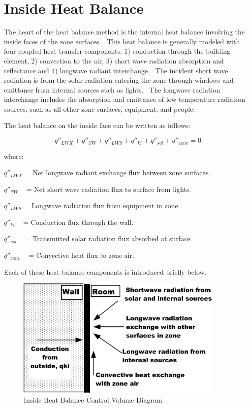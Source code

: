 \section{Inside Heat Balance}\label{inside-heat-balance}

The heart of the heat balance method is the internal heat balance involving the inside faces of the zone surfaces.~ This heat balance is generally modeled with four coupled heat transfer components: 1) conduction through the building element, 2) convection to the air, 3) short wave radiation absorption and reflectance and 4) longwave radiant interchange.~ The incident short wave radiation is from the solar radiation entering the zone through windows and emittance from internal sources such as lights.~ The longwave radiation interchange includes the absorption and emittance of low temperature radiation sources, such as all other zone surfaces, equipment, and people.

The heat balance on the inside face can be written as follows:

\begin{equation}
{q''_{LWX}} + {q''_{SW}} + {q''_{LWS}} + {q''_{ki}} + {q''_{sol}} + {q''_{conv}} = 0
\end{equation}

where:

\({q''_{LWX}}\) = Net longwave radiant exchange flux between zone surfaces.

\({q''_{SW}}\) ~ = Net short wave radiation flux to surface from lights.

\({q''_{LWS}}\) = Longwave radiation flux from equipment in zone.

\({q''_{ki}}\) ~ = Conduction flux through the wall.

\({q''_{sol}}\) ~ = Transmitted solar radiation flux absorbed at surface.

\({q''_{conv}}\) ~ = Convective heat flux to zone air.

Each of these heat balance components is introduced briefly below.

\begin{figure}[hbtp] %
\centering
\includegraphics[width=0.9\textwidth, height=0.9\textheight, keepaspectratio=true]{media/image301.png}
\caption{  Inside Heat Balance Control Volume Diagram \protect \label{fig:inside-heat-balance-control-volume-diagram}}
\end{figure}

